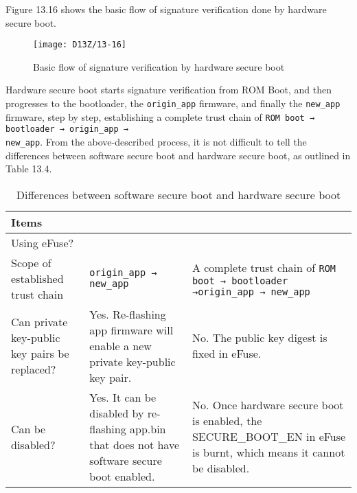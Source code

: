 \documentclass[a4paper,12pt]{book}
\begin{document}
Figure 13.16 shows the basic flow of signature verification done by hardware secure boot.

\begin{figure}[!h]
    \centering
    \texttt{[image: D13Z/13-16]}
    \caption{Basic flow of signature verification by hardware secure boot}
\end{figure}


Hardware secure boot starts signature verification from ROM Boot, and then progresses to the bootloader, the \verb|origin_app| firmware, and finally the \verb|new_app| firmware, step by step, establishing a complete trust chain of \verb|ROM boot → bootloader → origin_app → |\\ \verb|new_app|. From the above-described process, it is not difficult to tell the differences between software secure boot and hardware secure boot, as outlined in Table 13.4.

\begin{table}[h!]
    \renewcommand{\arraystretch}{1.4}
    \caption{Differences between software secure boot and hardware secure boot}
    \begin{tabular}{|>{\Centering}m{10em}|>{\RaggedRight}m{13em}|>{\RaggedRight}m{15em}|}
        \hline
        \rowcolor{LightBlue} \textbf{Items}&\multicolumn{1}{c|}{\textbf{Software Secure Boot}}&\multicolumn{1}{c|}{\textbf{Hardware Secure Boot}}\\
        \hline
        Using eFuse?&\multicolumn{1}{c|}{No.}&\multicolumn{1}{c|}{Yes.}\\
        \hline
        Scope of established trust chain&\verb|origin_app → new_app|&A complete trust chain of \verb|ROM boot → bootloader →|\newline \verb|origin_app → new_app|\\
        \hline
        Can private key-public key pairs be replaced?&Yes. Re-flashing app firmware will enable a new private key-public key pair.&No. The public key digest is fixed in eFuse.\\
        \hline
        Can be disabled?&Yes. It can be disabled by re-flashing app.bin that does not have software secure boot enabled.&No. Once hardware secure boot is enabled, the SECURE\_BOOT\_EN in eFuse is burnt, which means it cannot be disabled.\\
        \hline
    \end{tabular}
\end{table}
\end{document}
